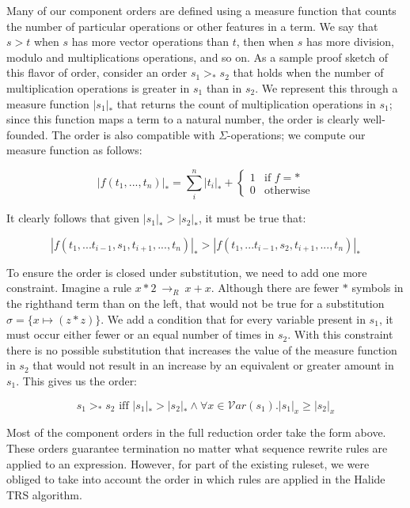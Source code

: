 \documentclass[acmsmall,review,anonymous]{acmart}\settopmatter{printfolios=true,printccs=false,printacmref=false}
\newcommand{\rewrites}[0]{\:\rightarrow_{R}\:}
\begin{document}
Many of our component orders are defined using a measure function that counts the number of particular operations or other features in a term. We say that $s > t$ when $s$ has more vector operations than $t$, then when $s$ has more division, modulo and multiplications operations, and so on. As a sample proof sketch of this flavor of order, consider an order $s_1 >_* s_2$ that holds when the number of multiplication operations is greater in $s_1$ than in $s_2$. We represent this through a measure function $|s_1|_*$ that returns the count of multiplication operations in $s_1$; since this function maps a term to a natural number, the order is clearly well-founded. The order is also compatible with $\Sigma$-operations; we compute our measure function as follows:


\[
|f(t_1,...,t_n)|_* = \sum_i^n |t_i|_* + \begin{cases} 1 & \textrm{if } f = * \\
                                                      0 & \textrm{otherwise}
                                        \end{cases}
\]

It clearly follows that given $|s_1|_* > |s_2|_*$, it must be true that:

\[
|f(t_1,...t_{i-1},s_1,t_{i+1},...,t_n)|_* > |f(t_1,...t_{i-1},s_2,t_{i+1},...,t_n)|_*
\]

To ensure the order is closed under substitution, we need to add one more constraint. Imagine a rule $x * 2 \rewrites x + x$. Although there are fewer $*$ symbols in the righthand term than on the left, that would not be true for a substitution $\sigma = \{x \mapsto (z * z)\}$. We add a condition that for every variable present in $s_1$, it must occur either fewer or an equal number of times in $s_2$. With this constraint there is no possible substitution that increases the value of the measure function in $s_2$ that would not result in an increase by an equivalent or greater amount in $s_1$. This gives us the order:

\[
s_1 >_* s_2 \textrm{ iff } |s_1|_* > |s_2|_* \wedge \forall x \in \mathcal{V}ar(s_1) . |s_1|_x \geq |s_2|_x
\]

Most of the component orders in the full reduction order take the form above. These orders guarantee termination no matter what sequence rewrite rules are applied to an expression. However, for part of the existing ruleset, we were obliged to take into account the order in which rules are applied in the Halide TRS algorithm.
\end{document}
